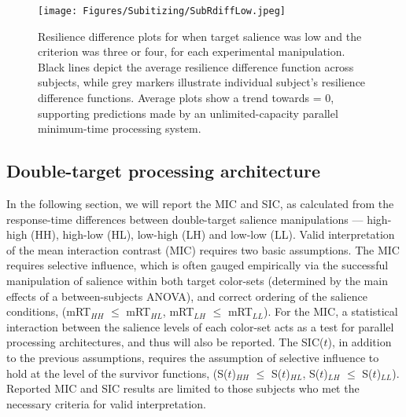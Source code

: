 \begin{figure}[hbt]
\centering \texttt{[image: Figures/Subitizing/SubRdiffLow.jpeg]}
\caption{Resilience difference plots for when target salience was low and the criterion was three or four, for each experimental manipulation. Black lines depict the average resilience difference function across subjects, while grey markers illustrate individual subject’s resilience difference functions. Average plots show a trend towards \Rd = 0, supporting predictions made by an unlimited-capacity parallel minimum-time processing system.}
\label{fig:subRdifflow}
\end{figure}

\subsection{Double-target processing architecture}
In the following section, we will report the MIC and SIC, as calculated from the response-time differences between double-target salience manipulations --- high-high (HH), high-low (HL), low-high (LH) and low-low (LL). Valid interpretation of the mean interaction contrast (MIC) requires two basic assumptions. The MIC requires selective influence, which is often gauged empirically via the successful manipulation of salience within both target color-sets (determined by the main effects of a between-subjects ANOVA), and correct ordering of the salience conditions, (\ie mRT$_{HH}$ $\leq$ mRT$_{HL}$, mRT$_{LH}$ $\leq$ mRT$_{LL}$). For the MIC, a statistical interaction between the salience levels of each color-set acts as a test for parallel processing architectures, and thus will also be reported. The SIC($t$), in addition to the previous assumptions, requires the assumption of selective influence to hold at the level of the survivor functions, (\ie S($t$)$_{HH}$ $\leq$ S($t$)$_{HL}$, S($t$)$_{LH}$ $\leq$ S($t$)$_{LL}$). Reported MIC and SIC results are limited to those subjects who met the necessary criteria for valid interpretation. 



